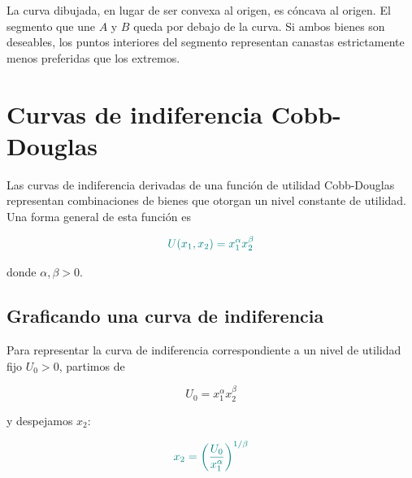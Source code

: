 \documentclass{article}
\begin{document}
\begin{center}
\end{center}

La curva dibujada, en lugar de ser convexa al origen, es cóncava al origen. El segmento que une \(A\) y \(B\) queda por debajo de la curva. Si ambos bienes son deseables, los puntos interiores del segmento representan canastas estrictamente menos preferidas que los extremos.


\section*{Curvas de indiferencia Cobb-Douglas}

Las {\color{teal}curvas de indiferencia} derivadas de una función de utilidad Cobb-Douglas representan combinaciones de bienes que otorgan un {\color{teal}nivel constante de utilidad}. Una forma general de esta función es

\[
{\color{teal}
U(x_1,x_2)=x_1^\alpha x_2^\beta
}
\]

donde \(\alpha,\beta>0\).

\subsection*{Graficando una curva de indiferencia}

Para representar la curva de indiferencia correspondiente a un nivel de utilidad fijo \(U_0>0\), partimos de

\[
U_0=x_1^\alpha x_2^\beta
\]

y despejamos \(x_2\):

\[
{\color{teal}
x_2=
\left(
\frac{U_0}{x_1^\alpha}
\right)^{1/\beta}
}
\]
\end{document}
